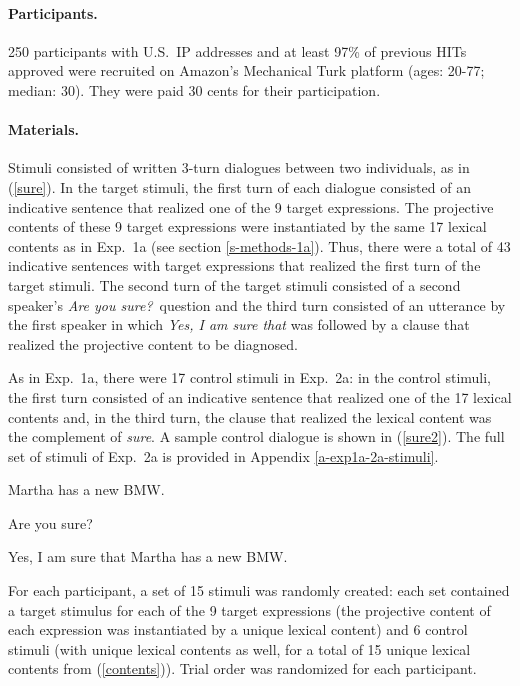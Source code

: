\documentclass[11pt,fleqn]{article}
\newcommand{\6}{\mbox{$[\hspace*{-.6mm}[$}}
\newcommand{\9}{\mbox{$]\hspace*{-.6mm}]$}}
\begin{document}
\paragraph{Participants.} 250 participants with U.S.\ IP addresses and at least 97\% of previous HITs approved were recruited on Amazon's Mechanical Turk platform (ages: 20-77; median: 30). They were paid 30 cents for their participation.


\paragraph{Materials.} Stimuli consisted of written 3-turn dialogues between two individuals, as in (\ref{sure}). In the target stimuli, the first turn of each dialogue consisted of an indicative sentence that realized one of the 9 target expressions. The projective contents of these 9 target expressions were instantiated by the same 17 lexical contents as in Exp.~1a (see section \ref{s-methods-1a}). Thus, there were a total of 43 indicative sentences with target expressions that realized the first turn of the target stimuli. The second turn of the target stimuli consisted of a second speaker's {\em Are you sure?}~question and the third turn consisted of an utterance by the first speaker in which {\em Yes, I am sure that} was followed by a clause that realized the projective content to be diagnosed.

As in Exp.~1a, there were 17 control stimuli in Exp.~2a: in the control stimuli, the first turn consisted of an indicative sentence that realized one of the 17 lexical contents and, in the third turn, the clause that realized the lexical content was the complement of {\em sure}. A sample control dialogue is shown in (\ref{sure2}). The full set of stimuli of Exp.~2a is provided in Appendix \ref{a-exp1a-2a-stimuli}.


\begin{exe}
\ex\label{sure2}
\begin{xlist}
 Martha has a new BMW.

 Are you sure?

 Yes, I am sure that Martha has a new BMW.
\end{xlist}
\end{exe}

For each participant, a set of 15 stimuli was randomly created: each set contained a target stimulus for each of the 9 target expressions (the projective content of each expression was instantiated by a unique lexical content) and 6 control stimuli (with unique lexical contents as well, for a total of 15 unique lexical contents from (\ref{contents})). Trial order was randomized for each participant.
\end{document}

